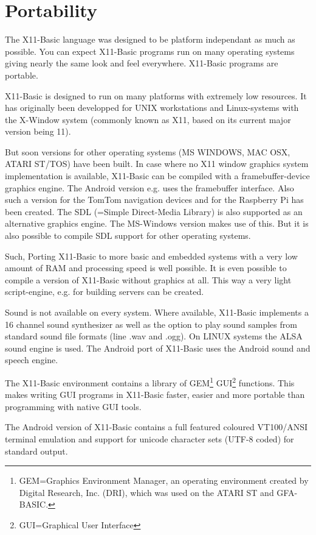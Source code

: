 \section*{Portability}

The X11-Basic language was designed to be platform independant as much as possible. 
You can expect X11-Basic programs run on many operating systems giving nearly the 
same look and feel everywhere. X11-Basic programs are portable.

X11-Basic is designed to run on many platforms with extremely low resources. It has
originally been developped for UNIX workstations and Linux-systems with the X-Window
system (commonly known as X11, based on its current major version being 11). 

But soon versions for other operating systems (MS WINDOWS, MAC OSX, ATARI ST/TOS) have 
been built. In case where no X11 window graphics system implementation is available,
X11-Basic can be compiled with a framebuffer-device graphics engine. The Android version
e.g. uses the framebuffer interface. Also such a version for the TomTom navigation 
devices and for the Raspberry Pi has been created.
The SDL (=Simple
Direct-Media Library) is also supported as an alternative graphics engine. 
The MS-Windows version makes use of this. But it is also possible to compile SDL support 
for other operating systems. 

Such, Porting X11-Basic to more basic and embedded systems with a very low amount of
RAM and processing speed is well possible. It is even possible to compile a version
of X11-Basic without graphics at all. This way a very light script-engine, e.g. for 
building servers can be created.

Sound is not available on every system. Where available, X11-Basic implements a 
16 channel sound synthesizer as well as the option to play sound samples from
standard sound file formats (line .wav and .ogg). On LINUX systems the ALSA
sound engine is used. The Android port of X11-Basic uses the Android sound and
speech engine.

The X11-Basic environment contains a library of GEM\footnote{GEM=Graphics
Environment Manager, an operating environment created by Digital Research, Inc.
(DRI), which was used on the ATARI ST and GFA-BASIC.} GUI\footnote{GUI=Graphical
User Interface} functions. This makes writing GUI programs in X11-Basic faster,
easier and more portable than programming with native GUI tools.

The Android version of X11-Basic contains a full featured coloured 
VT100/ANSI terminal emulation and support for unicode character sets 
(UTF-8 coded) for standard output.


